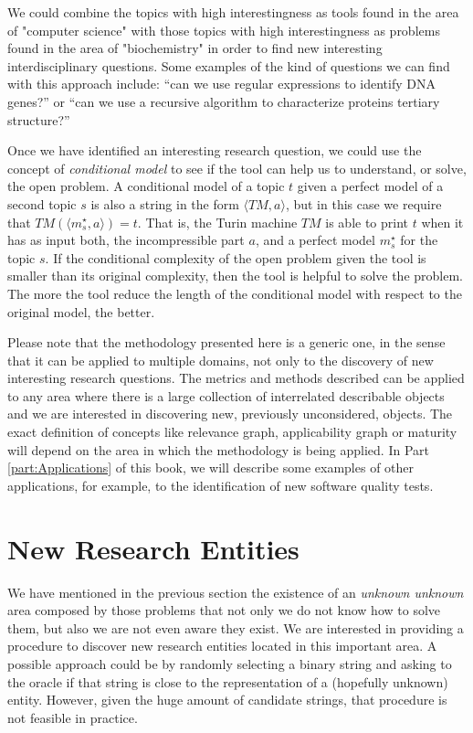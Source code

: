 \begin{example}
We could combine the topics with high interestingness as tools found in the area of "computer science" with those topics with high interestingness as problems found in the area of "biochemistry" in order to find new interesting interdisciplinary questions. Some examples of the kind of questions we can find with this approach include: “can we use regular expressions to identify DNA genes?” or “can we use a recursive algorithm to characterize proteins tertiary structure?”
\end{example}

Once we have identified an interesting research question, we could use the concept of \emph{conditional model} to see if the tool can help us to understand, or solve, the open problem. A conditional model of a topic $t$ given a perfect model of a second topic $s$ is also a string in the form $\langle TM,a \rangle$, but in this case we require that $TM \left(\langle m_s^\star, a \rangle \right) = t$. That is, the Turin machine $TM$ is able to print $t$ when it has as input both, the incompressible part $a$, and a perfect model $m_s^\star$ for the topic $s$. If the conditional complexity of the open problem given the tool is smaller than its original complexity, then the tool is helpful to solve the problem. The more the tool reduce the length of the conditional model with respect to the original model, the better.

Please note that the methodology presented here is a generic one, in the sense that it can be applied to multiple domains, not only to the discovery of new interesting research questions. The metrics and methods described can be applied to any area where there is a large collection of interrelated describable objects and we are interested in discovering new, previously unconsidered, objects. The exact definition of concepts like relevance graph, applicability graph or maturity will depend on the area in which the methodology is being applied. In Part \ref{part:Applications} of this book, we will describe some examples of other applications, for example, to the identification of new software quality tests.

%
%

\section{New Research Entities}
\label{sec:intro_research_topics}

We have mentioned in the previous section the existence of an \emph{unknown unknown} area composed by those problems that not only we do not know how to solve them, but also we are not even aware they exist. We are interested in providing a procedure to discover new research entities located in this important area. A possible approach could be by randomly selecting a binary string and asking to the oracle if that string is close to the representation of a (hopefully unknown) entity. However, given the huge amount of candidate strings, that procedure is not feasible in practice.

